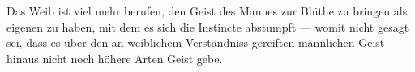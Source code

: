 Das Weib ist viel mehr berufen, den Geist des Mannes zur Blüthe zu bringen als eigenen zu haben, mit dem es sich die Instincte abstumpft — womit nicht gesagt sei, dass es über den an weiblichem Verständniss gereiften männlichen Geist hinaus nicht noch höhere Arten Geist gebe.
\par

